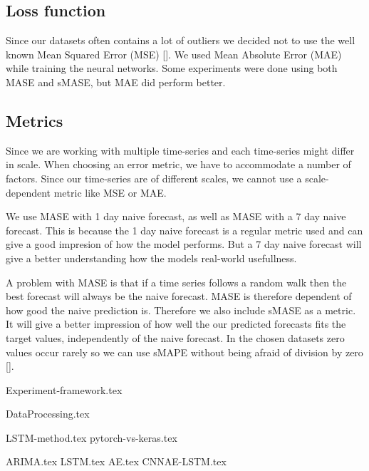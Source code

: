\subsection*{Loss function}
Since our datasets often contains a lot of outliers we decided not to use the well known
Mean Squared Error (MSE) [].
We used Mean Absolute Error (MAE) while training the neural networks.
Some experiments were done using both MASE and sMASE, but MAE did perform better.

\subsection*{Metrics}
Since we are working with multiple time-series and each time-series might differ in scale.
When choosing an error metric, we have to accommodate a number of factors.
Since our time-series are of different scales, we cannot use a scale-dependent metric
like MSE or MAE.


We use MASE with 1 day naive forecast, as well as MASE with a 7 day
naive forecast. This is because the 1 day naive forecast is a regular metric used
and can give a good impresion of how the model performs. But a 7 day naive forecast
will give a better understanding how the models real-world usefullness.

A problem with MASE is that if a time series follows a random walk
then the best forecast will always be the naive forecast. MASE is therefore dependent of
how good the naive prediction is.
Therefore we also include sMASE as a metric. It will give a better impression
of how well the our predicted forecasts fits the target values, independently of
the naive forecast. In the chosen datasets zero values occur rarely so we can use sMAPE without
being afraid of division by zero [].


{Experiment-framework.tex}

{DataProcessing.tex}

{LSTM-method.tex}
{pytorch-vs-keras.tex}


{ARIMA.tex}
{LSTM.tex}
{AE.tex}
{CNNAE-LSTM.tex}
